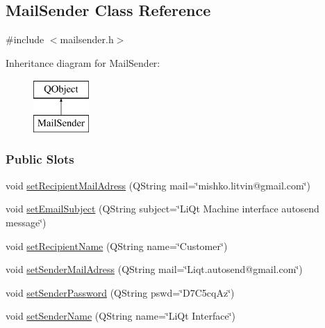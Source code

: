 \hypertarget{classMailSender}{}\subsection{Mail\+Sender Class Reference}
\label{classMailSender}


{\ttfamily \#include $<$mailsender.\+h$>$}

Inheritance diagram for Mail\+Sender\+:\begin{figure}[H]
\begin{center}
\leavevmode
\includegraphics[height=2.000000cm]{classMailSender}
\end{center}
\end{figure}
\subsubsection*{Public Slots}
\begin{DoxyCompactItemize}
\item 
void \mbox{\hyperlink{classMailSender_ab2086805ee1168d42959ddbe7231bf5f}{set\+Recipient\+Mail\+Adress}} (Q\+String mail=\char`\"{}mishko.\+litvin@gmail.\+com\char`\"{})
\item 
void \mbox{\hyperlink{classMailSender_a9e5b40867b2bc78a71d4e91afabbefc6}{set\+Email\+Subject}} (Q\+String subject=\char`\"{}Li\+Qt Machine interface autosend message\char`\"{})
\item 
void \mbox{\hyperlink{classMailSender_aba231256948b0abb340452b8f902955d}{set\+Recipient\+Name}} (Q\+String name=\char`\"{}Customer\char`\"{})
\item 
void \mbox{\hyperlink{classMailSender_a3da1ed689ff76134c9ba5704ae724951}{set\+Sender\+Mail\+Adress}} (Q\+String mail=\char`\"{}Liqt.\+autosend@gmail.\+com\char`\"{})
\item 
void \mbox{\hyperlink{classMailSender_a3d97c584ca24948d320d31d10cc74089}{set\+Sender\+Password}} (Q\+String pswd=\char`\"{}D7\+C5cq\+Az\char`\"{})
\item 
void \mbox{\hyperlink{classMailSender_a23f9bd461f1f7583e7669430b4f01b59}{set\+Sender\+Name}} (Q\+String name=\char`\"{}Li\+Qt Interface\char`\"{})
\end{DoxyCompactItemize}
